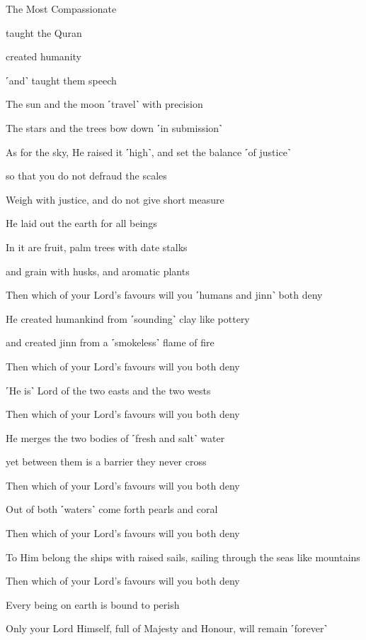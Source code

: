 The Most Compassionate

taught the Quran

created humanity

˹and˺ taught them speech

The sun and the moon ˹travel˺ with precision

The stars and the trees bow down ˹in submission˺

As for the sky, He raised it ˹high˺, and set the balance ˹of justice˺

so that you do not defraud the scales

Weigh with justice, and do not give short measure

He laid out the earth for all beings

In it are fruit, palm trees with date stalks

and grain with husks, and aromatic plants

Then which of your Lord’s favours will you ˹humans and jinn˺ both deny

He created humankind from ˹sounding˺ clay like pottery

and created jinn from a ˹smokeless˺ flame of fire

Then which of your Lord’s favours will you both deny

˹He is˺ Lord of the two easts and the two wests

Then which of your Lord’s favours will you both deny

He merges the two bodies of ˹fresh and salt˺ water

yet between them is a barrier they never cross

Then which of your Lord’s favours will you both deny

Out of both ˹waters˺ come forth pearls and coral

Then which of your Lord’s favours will you both deny

To Him belong the ships with raised sails, sailing through the seas like mountains

Then which of your Lord’s favours will you both deny

Every being on earth is bound to perish

Only your Lord Himself, full of Majesty and Honour, will remain ˹forever˺

